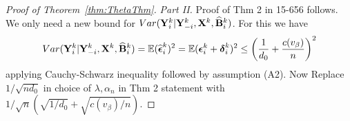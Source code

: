 \documentclass[12pt, letterpaper]{article}
\numberwithin{equation}{section}
\begin{document}
\begin{proof}[Proof of Theorem~\ref{thm:ThetaThm}]
%
%
%

\textit{Part II.} Proof of Thm 2 in 15-656 follows. We only need a new bound for $Var ({\mathbf{Y}}_i^k | {\mathbf{Y}}_{-i}^k, {\mathbf{X}}^k, \widehat {{\mathbf{B}}}_i^k)$. For this we have
%
$$ Var ({\mathbf{Y}}_i^k | {\mathbf{Y}}_{-i}^k, {\mathbf{X}}^k, \widehat {{\mathbf{B}}}_i^k) = {\mathbb{E}} (\widehat {{\boldsymbol{\epsilon}}}_i^k)^2
= {\mathbb{E}} ( {\boldsymbol{\epsilon}}_i^k + {\boldsymbol{\delta}}_i^k)^2
\leq \left( \frac{1}{d_0} + \frac{c(v_\beta)}{n} \right)^2
$$
%
applying Cauchy-Schwarz inequality followed by assumption (A2). Now Replace $1/\sqrt{n d_0}$ in choice of $\lambda, \alpha_n$ in Thm 2 statement with $1/\sqrt{n} (\sqrt{1/d_0} + \sqrt{c(v_\beta)/ n})$.

\end{proof}
\end{document}
